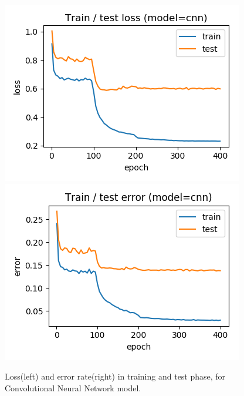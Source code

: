 \documentclass[journal]{IEEEtran}
\begin{document}
\begin{figure}[htb]
  \includegraphics[width=\linewidth]{images/cnn-loss.png}
\endminipage\hfill
{}
  \includegraphics[width=\linewidth]{images/cnn-error.png}
\endminipage
\caption{Loss(left) and error rate(right) in training and test phase, for Convolutional Neural Network model.}\label{fig:cnn_loss}
\end{figure}
\end{document}
